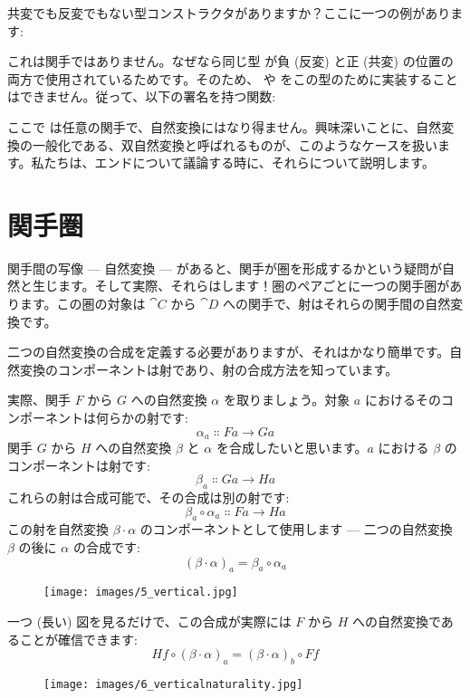 共変でも反変でもない型コンストラクタがありますか？ここに一つの例があります: 

これは関手ではありません。なぜなら同じ型  が負 (反変) と正 (共変) の位置の両方で使用されているためです。そのため、 や  をこの型のために実装することはできません。従って、以下の署名を持つ関数: 

ここで  は任意の関手で、自然変換にはなり得ません。興味深いことに、自然変換の一般化である、双自然変換と呼ばれるものが、このようなケースを扱います。私たちは、エンドについて議論する時に、それらについて説明します。

\section{関手圏}

関手間の写像 --- 自然変換 --- があると、関手が圏を形成するかという疑問が自然と生じます。そして実際、それらはします！圏のペアごとに一つの関手圏があります。この圏の対象は $\cat{C}$ から $\cat{D}$ への関手で、射はそれらの関手間の自然変換です。

二つの自然変換の合成を定義する必要がありますが、それはかなり簡単です。自然変換のコンポーネントは射であり、射の合成方法を知っています。

実際、関手 $F$ から $G$ への自然変換 $\alpha$ を取りましょう。対象 $a$ におけるそのコンポーネントは何らかの射です: 
\[\alpha_a \Colon F a \to G a\]
関手 $G$ から $H$ への自然変換 $\beta$ と $\alpha$ を合成したいと思います。$a$ における $\beta$ のコンポーネントは射です: 
\[\beta_a \Colon G a \to H a\]
これらの射は合成可能で、その合成は別の射です: 
\[\beta_a \circ \alpha_a \Colon F a \to H a\]
この射を自然変換 $\beta \cdot \alpha$ のコンポーネントとして使用します --- 二つの自然変換 $\beta$ の後に $\alpha$ の合成です: 
\[(\beta \cdot \alpha)_a = \beta_a \circ \alpha_a\]

\begin{figure}[H]
  \centering
  \texttt{[image: images/5\_vertical.jpg]}
\end{figure}

\noindent
一つ (長い) 図を見るだけで、この合成が実際には $F$ から $H$ への自然変換であることが確信できます: 
\[H f \circ (\beta \cdot \alpha)_a = (\beta \cdot \alpha)_b \circ F f\]

\begin{figure}[H]
  \centering
  \texttt{[image: images/6\_verticalnaturality.jpg]}
\end{figure}

